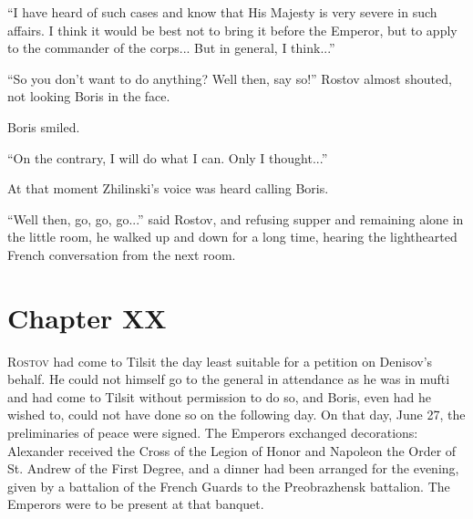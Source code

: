 ``I have heard of such cases and know that His Majesty is very
severe in such affairs. I think it would be best not to bring it
before the Emperor, but to apply to the commander of the
corps... But in general, I think...''

``So you don't want to do anything? Well then, say so!'' Rostov
almost shouted, not looking Boris in the face.

Boris smiled.

``On the contrary, I will do what I can. Only I thought...''

At that moment Zhilinski's voice was heard calling Boris.

``Well then, go, go, go...'' said Rostov, and refusing supper and
remaining alone in the little room, he walked up and down for a
long time, hearing the lighthearted French conversation from the
next room.


\chapter*{Chapter XX}
\ifaudio     
{} 
\fi

\lettrine[lines=2, loversize=0.3, lraise=0]{\initfamily R}{ostov}
had come to Tilsit the day least suitable for a petition
on Denisov's behalf. He could not himself go to the general in
attendance as he was in mufti and had come to Tilsit without
permission to do so, and Boris, even had he wished to, could not
have done so on the following day. On that day, June 27, the
preliminaries of peace were signed. The Emperors exchanged
decorations: Alexander received the Cross of the Legion of Honor
and Napoleon the Order of St. Andrew of the First Degree, and a
dinner had been arranged for the evening, given by a battalion of
the French Guards to the Preobrazhensk battalion. The Emperors
were to be present at that banquet.

